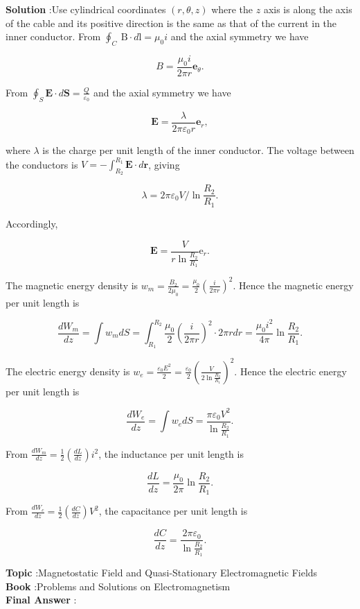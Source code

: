 \documentclass[10pt]{article}
\begin{document}
\textbf{Solution} :Use cylindrical coordinates $(r, \theta, z)$ where the $z$ axis is along the axis of the cable and its positive direction is the same as that of the current in the inner conductor. From $\oint_{C} \mathrm{~B} \cdot d \mathrm{l}=\mu_{0} i$ and the axial symmetry we have

$$
B=\frac{\mu_{0} i}{2 \pi r} \mathbf{e}_{\theta} .
$$

From $\oint_{S} \mathbf{E} \cdot d \mathbf{S}=\frac{Q}{\varepsilon_{0}}$ and the axial symmetry we have

$$
\mathbf{E}=\frac{\lambda}{2 \pi \varepsilon_{0} r} \mathbf{e}_{r},
$$

where $\lambda$ is the charge per unit length of the inner conductor. The voltage between the conductors is $V=-\int_{R_{2}}^{R_{1}} \mathbf{E} \cdot d \mathbf{r}$, giving

$$
\lambda=2 \pi \varepsilon_{0} V / \ln \frac{R_{2}}{R_{1}} .
$$

Accordingly,

$$
\mathbf{E}=\frac{V}{r \ln \frac{R_{2}}{R_{1}}} \mathrm{e}_{r} .
$$

 The magnetic energy density is $w_{m}=\frac{B_{2}}{2 \mu_{0}}=\frac{\mu_{0}}{2}\left(\frac{i}{2 \pi r}\right)^{2}$. Hence the magnetic energy per unit length is

$$
\frac{d W_{m}}{d z}=\int w_{m} d S=\int_{R_{1}}^{R_{2}} \frac{\mu_{0}}{2}\left(\frac{i}{2 \pi r}\right)^{2} \cdot 2 \pi r d r=\frac{\mu_{0} i^{2}}{4 \pi} \ln \frac{R_{2}}{R_{1}} .
$$

The electric energy density is $w_{e}=\frac{\varepsilon_{0} E^{2}}{2}=\frac{\varepsilon_{0}}{2}\left(\frac{V}{2 \ln \frac{R_{2}}{R_{1}}}\right)^{2}$. Hence the electric energy per unit length is

$$
\frac{d W_{e}}{d z}=\int w_{e} d S=\frac{\pi \varepsilon_{0} V^{2}}{\ln \frac{R_{2}}{R_{1}}} .
$$

 From $\frac{d W_{m}}{d z}=\frac{1}{2}\left(\frac{d L}{d z}\right) i^{2}$, the inductance per unit length is

$$
\frac{d L}{d z}=\frac{\mu_{0}}{2 \pi} \ln \frac{R_{2}}{R_{1}} .
$$

From $\frac{d W_{c}}{d z}=\frac{1}{2}\left(\frac{d C}{d z}\right) V^{2}$, the capacitance per unit length is

$$
\frac{d C}{d z}=\frac{2 \pi \varepsilon_{0}}{\ln \frac{R_{2}}{R_{1}}} .
$$

\textbf{Topic} :Magnetostatic Field and Quasi-Stationary Electromagnetic Fields\\
\textbf{Book} :Problems and Solutions on Electromagnetism\\
\textbf{Final Answer} :\\
\end{document}
